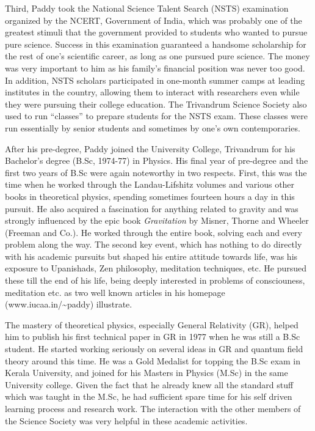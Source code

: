 \documentclass[prd, preprint, longbibliography, 12pt]{revtex4-2}
\begin{document}
Third, Paddy took the National Science Talent Search (NSTS)
examination organized by the NCERT, Government of India, which was
probably one of the greatest stimuli that the government provided to
students who wanted to pursue pure science.
Success in this examination guaranteed a handsome scholarship for the
rest of one's scientific career, as long as one pursued pure science.
The money was very important to him as his  family's financial
position was never too good.
In addition, NSTS scholars participated in one-month summer camps at
leading institutes in the country, allowing them to interact with
researchers even while they were pursuing their college education.
The Trivandrum Science Society also used to run ``classes'' to prepare
students for the NSTS exam.
These classes were run essentially by senior students and sometimes by
one's own contemporaries.

After his pre-degree, Paddy joined the University College, Trivandrum
for his Bachelor's degree (B.Sc, 1974-77) in Physics.
His final year of pre-degree and the first two years of B.Sc were
again noteworthy in two respects.
First, this was the time when he worked through the Landau-Lifshitz
volumes and various other books in theoretical physics, spending
sometimes fourteen hours a day in this pursuit.
He also acquired a fascination for anything related to gravity and was
strongly influenced  by the epic book \textit{Gravitation} by Misner,
Thorne and Wheeler (Freeman and Co.).
He worked through the entire book, solving each and every problem
along the way. 
The second key event, which has nothing to do directly with his
academic pursuits but shaped his entire attitude towards life, was his
exposure to Upanishads, Zen philosophy, meditation techniques, etc.
He pursued these till the end of his life, being deeply
interested in problems of consciouness, meditation etc. as two well
known articles in his homepage (www.iucaa.in/\~{}paddy) illustrate.

The mastery of theoretical physics, especially General Relativity
(GR), helped him to publish his first technical paper in GR in 1977
when he was still a B.Sc student.
He started working seriously on several ideas in GR and quantum field
theory around this time.
He was a Gold Medalist for  topping the  B.Sc exam in
Kerala University, and joined for his Masters in Physics (M.Sc) in the
same University college.
Given the fact that he already knew all the standard stuff which was
taught in the M.Sc, he had sufficient spare time for his self driven
learning process and research work.
The interaction with the other members of the Science Society was very
helpful in these academic activities.  
\end{document}
